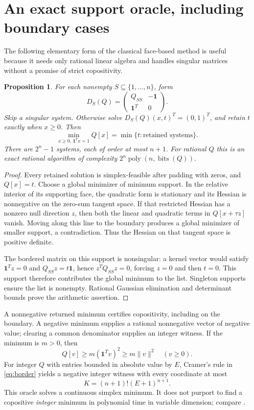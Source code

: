 \documentclass[11pt]{article}
\newtheorem{proposition}[theorem]{Proposition}
\theoremstyle{remark}\newtheorem{remark}[theorem]{Remark}
\newcommand{\norm}[1]{\lVert#1\rVert}
\newcommand{\bits}{\operatorname{bits}}
\begin{document}
\section{An exact support oracle, including boundary cases}\label{sec:oracle}
The following elementary form of the classical face-based method is useful because it needs only rational linear algebra and handles singular matrices without a promise of strict copositivity.
\begin{proposition}\label{prop:oracle}
For each nonempty $S\subseteq\{1,\ldots,n\}$, form
\begin{equation}\label{eq:border}
 D_S(Q)=\begin{pmatrix}Q_{SS}&-\mathbf1\\\mathbf1^T&0\end{pmatrix}.
\end{equation}
Skip a singular system. Otherwise solve
$D_S(Q)(x,t)^T=(0,1)^T$, and retain $t$ exactly when $x\ge0$. Then
\[
 \min_{x\ge0,\,\mathbf1^Tx=1}Q[x]
 =\min\{t:\text{retained systems}\}.
\]
There are $2^n-1$ systems, each of order at most $n+1$. For rational $Q$ this is an exact rational algorithm of complexity $2^n\operatorname{poly}(n,\bits(Q))$.
\end{proposition}
\begin{proof}
Every retained solution is simplex-feasible after padding with zeros, and $Q[x]=t$. Choose a global minimizer of minimum support. In the relative interior of its supporting face, the quadratic form is stationary and its Hessian is nonnegative on the zero-sum tangent space. If that restricted Hessian has a nonzero null direction $z$, then both the linear and quadratic terms in $Q[x+\tau z]$ vanish. Moving along this line to the boundary produces a global minimizer of smaller support, a contradiction. Thus the Hessian on that tangent space is positive definite.

The bordered matrix on this support is nonsingular: a kernel vector would satisfy $\mathbf1^Tz=0$ and $Q_{SS}z=t\mathbf1$, hence $z^TQ_{SS}z=0$, forcing $z=0$ and then $t=0$. This support therefore contributes the global minimum to the list. Singleton supports ensure the list is nonempty. Rational Gaussian elimination and determinant bounds prove the arithmetic assertion.
\end{proof}

A nonnegative returned minimum certifies copositivity, including on the boundary. A negative minimum supplies a rational nonnegative vector of negative value; clearing a common denominator supplies an integer witness. If the minimum is $m>0$, then
\begin{equation}\label{eq:simplexmargin}
 Q[v]\ge m(\mathbf1^Tv)^2\ge m\norm v^2\quad(v\ge0).
\end{equation}
For integer $Q$ with entries bounded in absolute value by $E$, Cramer's rule in \eqref{eq:border} yields a negative integer witness with every coordinate at most
\begin{equation}\label{eq:K}
 K=(n+1)!(E+1)^{n+1}.
\end{equation}
This oracle solves a continuous simplex minimum. It does not purport to find a copositive \emph{integer} minimum in polynomial time in variable dimension; compare \cite{OS25}.
\end{document}
